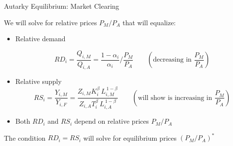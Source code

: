 \documentclass[notes,11pt, aspectratio=169, xcolor=table]{beamer}
\newenvironment{wideitemize}{\itemize\addtolength{\itemsep}{10pt}}{\enditemize}
\begin{document}
\begin{frame}{Autarky Equilibrium: Market Clearing}
\begin{wideitemize}
    \item We will solve for relative prices $P_M / P_A$ that will equalize:
    \begin{itemize}
        \item<2-> Relative demand

        \begin{equation*}
            RD_i = \frac{Q_{i,M}}{Q_{i,A}} = \frac{1-\alpha_i}{\alpha_i} / \frac{P_{M}}{P_{A}} \qquad \left(\text{decreasing in } \frac{P_{M}}{P_{A}}\right)
        \end{equation*}
        \item<3-> Relative supply
        \begin{equation*}
            RS_i = \frac{Y_{i,M}}{Y_{i,F}}
  = \frac{Z_{i,M}K_i^{\beta}\,L_{i,M}^{\,1-\beta}}
          {Z_{i,A}T_i^{\beta}\,L_{i,A}^{\,1-\beta}} \qquad \left(\text{will show is increasing in } \frac{P_{M}}{P_{A}}\right)
        \end{equation*}
        \item<4-> Both $RD_i$ and $RS_i$ depend on relative prices $P_M / P_A$
    \end{itemize}
    \item<5-> The condition $RD_i = RS_i$ will solve for equilibrium prices $(P_M / P_A)^*$
\end{wideitemize}
\end{frame}
\end{document}
